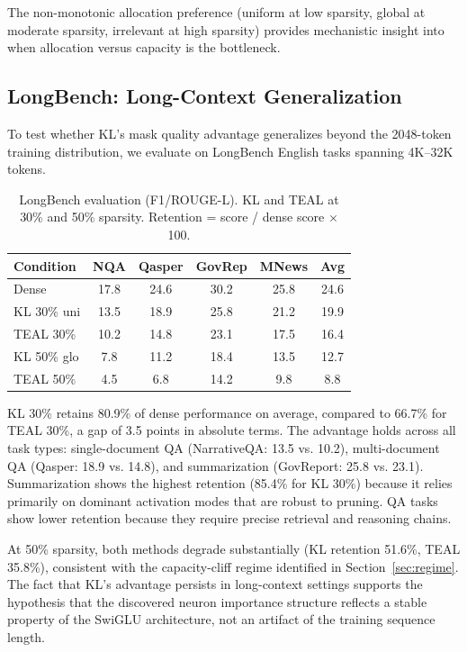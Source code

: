 \documentclass[11pt,a4paper]{article}
\begin{document}
The non-monotonic allocation preference (uniform at low sparsity, global at moderate sparsity, irrelevant at high sparsity) provides mechanistic insight into when allocation versus capacity is the bottleneck.

\subsection{LongBench: Long-Context Generalization}
\label{sec:longbench}

To test whether KL's mask quality advantage generalizes beyond the 2048-token training distribution, we evaluate on LongBench English tasks spanning 4K--32K tokens.

\begin{table}[h]
\centering
\small
\caption{LongBench evaluation (F1/ROUGE-L). KL and TEAL at 30\% and 50\% sparsity. Retention = score / dense score $\times$ 100.}
\label{tab:longbench}
\begin{tabular}{lccccc}
\toprule
\textbf{Condition} & \textbf{NQA} & \textbf{Qasper} & \textbf{GovRep} & \textbf{MNews} & \textbf{Avg} \\
\midrule
Dense & 17.8 & 24.6 & 30.2 & 25.8 & 24.6 \\
\midrule
KL 30\% uni & 13.5 & 18.9 & 25.8 & 21.2 & 19.9 \\
TEAL 30\% & 10.2 & 14.8 & 23.1 & 17.5 & 16.4 \\
\midrule
KL 50\% glo & 7.8 & 11.2 & 18.4 & 13.5 & 12.7 \\
TEAL 50\% & 4.5 & 6.8 & 14.2 & 9.8 & 8.8 \\
\bottomrule
\end{tabular}
\end{table}

KL 30\% retains 80.9\% of dense performance on average, compared to 66.7\% for TEAL 30\%, a gap of 3.5 points in absolute terms.
The advantage holds across all task types: single-document QA (NarrativeQA: 13.5 vs. 10.2), multi-document QA (Qasper: 18.9 vs. 14.8), and summarization (GovReport: 25.8 vs. 23.1).
Summarization shows the highest retention (85.4\% for KL 30\%) because it relies primarily on dominant activation modes that are robust to pruning.
QA tasks show lower retention because they require precise retrieval and reasoning chains.

At 50\% sparsity, both methods degrade substantially (KL retention 51.6\%, TEAL 35.8\%), consistent with the capacity-cliff regime identified in Section~\ref{sec:regime}.
The fact that KL's advantage persists in long-context settings supports the hypothesis that the discovered neuron importance structure reflects a stable property of the SwiGLU architecture, not an artifact of the training sequence length.
\end{document}
